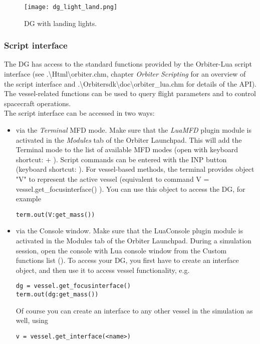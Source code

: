 \documentclass[Orbiter User Manual.tex]{subfiles}
\begin{document}
\begin{figure}[H]
  \centering
  \texttt{[image: dg\_light\_land.png]}
  \caption{DG with landing lights.}
\end{figure}



\subsubsection{Script interface}
The DG has access to the standard functions provided by the Orbiter-Lua script interface (see .\textbackslash Html\textbackslash orbiter.chm, chapter \textit{Orbiter Scripting} for an overview of the script interface and .\textbackslash Orbitersdk\textbackslash doc\textbackslash orbiter\_lua.chm for details of the API). The vessel-related functions can be used to query flight parameters and to control spacecraft operations.\\
The script interface can be accessed in two ways:

\begin{itemize}
\item via the \textit{Terminal} MFD mode. Make sure that the \textit{LuaMFD} plugin module is activated in the \textit{Modules} tab of the Orbiter Launchpad. This will add the Terminal mode to the list of available MFD modes (open with keyboard shortcut: \Shift{} + \Shift{}). Script commands can be entered with the INP button (keyboard shortcut: \Shift{}). For vessel-based methods, the terminal provides object "V" to represent the active vessel (equivalent to command V = vessel.get\_focusinterface() ). You can use this object to access the DG, for example

\begin{lstlisting}[language=OSFS]
term.out(V:get_mass())
\end{lstlisting}

\item via the Console window. Make sure that the LuaConsole plugin module is activated in the Modules tab of the Orbiter Launchpad. During a simulation session, open the console with Lua console window from the Custom functions list (\Ctrl{}). To access your DG, you first have to create an interface object, and then use it to access vessel functionality, e.g.

\begin{lstlisting}[language=OSFS]
dg = vessel.get_focusinterface()
term.out(dg:get_mass())
\end{lstlisting}

\noindent
Of course you can create an interface to any other vessel in the simulation as well, using

\begin{lstlisting}[language=OSFS]
v = vessel.get_interface(<name>)
\end{lstlisting}

\end{itemize}
\end{document}
